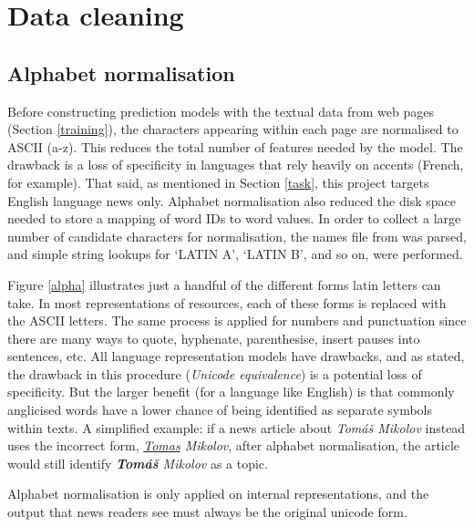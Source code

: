 \section{Data cleaning\label{clean}}
\subsection{Alphabet normalisation}
Before constructing prediction models with
the textual data from web pages (Section \ref{training}), the
characters appearing within each page are normalised to
ASCII (a-z).  This reduces the total number of features needed
by the model. The drawback  is a loss of specificity in
languages that rely heavily on accents (French, for example).
That said, as mentioned in Section \ref{task}, this project targets
English language news only.
Alphabet normalisation also reduced the disk space needed to store a
mapping of word IDs to word values.  In order to collect a large
number of candidate characters for normalisation, the names file from
 was parsed, and simple string lookups for `LATIN A',
`LATIN B', and so on, were performed.

Figure \ref{alpha} illustrates just a handful of
the different forms latin letters can take.  In most representations
of resources, each of these forms is replaced with the
ASCII letters.  The same process is applied for numbers and punctuation
since there are many ways to quote, hyphenate,
parenthesise, insert pauses into sentences, etc.  All language
representation models have drawbacks, and as stated, the drawback in
this procedure ({\it Unicode equivalence}) is a potential loss
of specificity.  But the larger benefit (for a language like English)
is that commonly anglicised words have a lower chance of being
identified as separate symbols within texts.  A simplified example: if
a news article about {\it Tomáš Mikolov} instead uses the incorrect
form, {\it \underline{Tomas} Mikolov}, after alphabet normalisation,
the article would still identify {\it {\bf Tomáš} Mikolov} as a topic.

Alphabet normalisation is only applied on internal representations,
and the output that news readers see must always be the original
unicode form.

